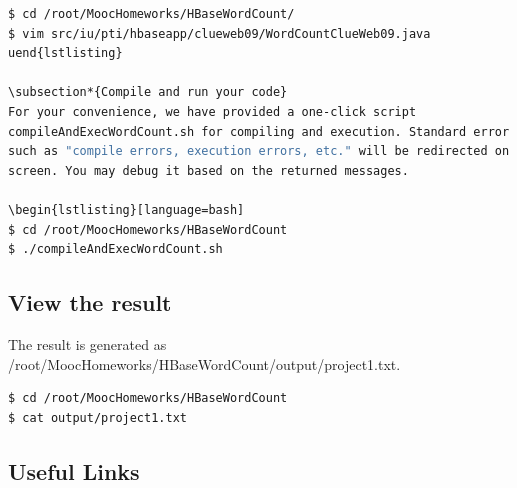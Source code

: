 \begin{lstlisting}[language=bash] 
$ cd /root/MoocHomeworks/HBaseWordCount/
$ vim src/iu/pti/hbaseapp/clueweb09/WordCountClueWeb09.java
uend{lstlisting}
 
\subsection*{Compile and run your code}
For your convenience, we have provided a one-click script
compileAndExecWordCount.sh for compiling and execution. Standard error messages
such as "compile errors, execution errors, etc." will be redirected on the
screen. You may debug it based on the returned messages.

\begin{lstlisting}[language=bash] 
$ cd /root/MoocHomeworks/HBaseWordCount
$ ./compileAndExecWordCount.sh
\end{lstlisting}
 
\subsection*{View the result}  
The result is generated as
/root/MoocHomeworks/HBaseWordCount/output/project1.txt. 

\begin{lstlisting}[language=bash] 
$ cd /root/MoocHomeworks/HBaseWordCount
$ cat output/project1.txt
\end{lstlisting}

\subsection*{Useful Links}
